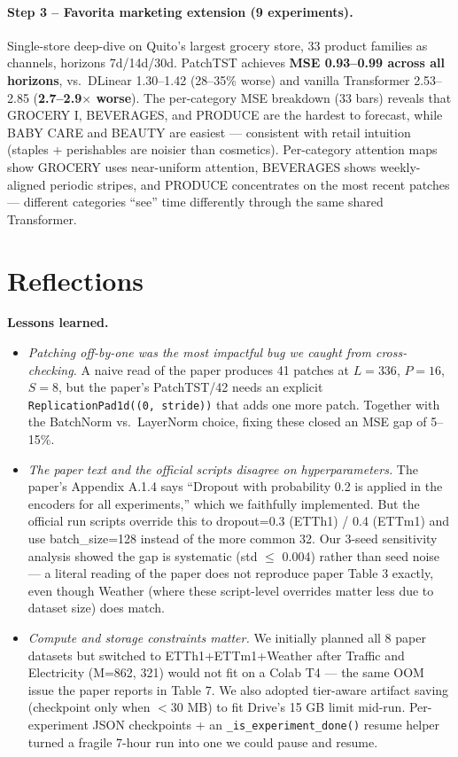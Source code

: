 \documentclass[11pt]{article}
\begin{document}
\paragraph{Step 3 -- Favorita marketing extension (9 experiments).} Single-store deep-dive on Quito's largest grocery store, 33 product families as channels, horizons 7d/14d/30d. PatchTST achieves \textbf{MSE 0.93--0.99 across all horizons}, vs.\ DLinear 1.30--1.42 (28--35\% worse) and vanilla Transformer 2.53--2.85 (\textbf{2.7--2.9$\times$ worse}). The per-category MSE breakdown (33 bars) reveals that GROCERY I, BEVERAGES, and PRODUCE are the hardest to forecast, while BABY CARE and BEAUTY are easiest --- consistent with retail intuition (staples + perishables are noisier than cosmetics). Per-category attention maps show GROCERY uses near-uniform attention, BEVERAGES shows weekly-aligned periodic stripes, and PRODUCE concentrates on the most recent patches --- different categories ``see'' time differently through the same shared Transformer.

\section{Reflections}\label{sec:reflections}

\textbf{Lessons learned.}
\begin{itemize}
    \item \emph{Patching off-by-one was the most impactful bug we caught from cross-checking.} A naive read of the paper produces 41 patches at $L{=}336$, $P{=}16$, $S{=}8$, but the paper's PatchTST/42 needs an explicit \texttt{ReplicationPad1d((0, stride))} that adds one more patch. Together with the BatchNorm vs.\ LayerNorm choice, fixing these closed an MSE gap of 5--15\%.
\item \emph{The paper text and the official scripts disagree on hyperparameters.} The paper's Appendix A.1.4 says ``Dropout with probability 0.2 is applied in the encoders for all experiments,'' which we faithfully implemented. But the official run scripts override this to dropout=0.3 (ETTh1) / 0.4 (ETTm1) and use batch\_size=128 instead of the more common 32. Our 3-seed sensitivity analysis showed the gap is systematic (std $\le$ 0.004) rather than seed noise --- a literal reading of the paper does not reproduce paper Table 3 exactly, even though Weather (where these script-level overrides matter less due to dataset size) does match.
\item \emph{Compute and storage constraints matter.} We initially planned all 8 paper datasets but switched to ETTh1+ETTm1+Weather after Traffic and Electricity (M=862, 321) would not fit on a Colab T4 --- the same OOM issue the paper reports in Table 7. We also adopted tier-aware artifact saving (checkpoint only when $<$30 MB) to fit Drive's 15 GB limit mid-run. Per-experiment JSON checkpoints + an \texttt{\_is\_experiment\_done()} resume helper turned a fragile 7-hour run into one we could pause and resume.
\end{itemize}
\end{document}

